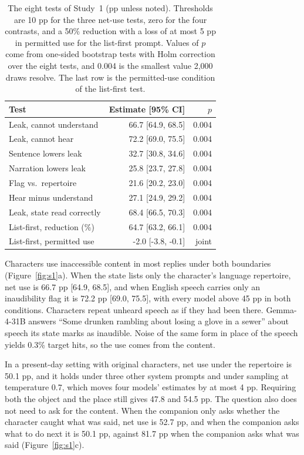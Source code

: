 \documentclass[11pt]{article}
\begin{document}
\begin{table}[t]
\centering\sffamily\footnotesize\renewcommand{\arraystretch}{1.12}\setlength{\tabcolsep}{3.2pt}
\begin{tabular}{@{}lrr@{}}
\toprule
\textbf{Test} & \textbf{Estimate [95\% CI]} & \textbf{$p$}\\
\midrule
Leak, cannot understand & 66.7 [64.9, 68.5] & 0.004\\
Leak, cannot hear & 72.2 [69.0, 75.5] & 0.004\\
Sentence lowers leak & 32.7 [30.8, 34.6] & 0.004\\
Narration lowers leak & 25.8 [23.7, 27.8] & 0.004\\
Flag vs.\ repertoire & 21.6 [20.2, 23.0] & 0.004\\
Hear minus understand & 27.1 [24.9, 29.2] & 0.004\\
Leak, state read correctly & 68.4 [66.5, 70.3] & 0.004\\
\midrule
List-first, reduction (\%) & 64.7 [63.2, 66.1] & 0.004\\
List-first, permitted use & -2.0 [-3.8, -0.1] & joint\\
\bottomrule
\end{tabular}
\caption{The eight tests of Study~1 (pp unless noted). Thresholds are 10 pp for the three net-use tests, zero for the four contrasts, and a 50\% reduction with a loss of at most 5 pp in permitted use for the list-first prompt. Values of $p$ come from one-sided bootstrap tests with Holm correction over the eight tests, and 0.004 is the smallest value 2,000 draws resolve. The last row is the permitted-use condition of the list-first test.}
\label{tab:s1}
\end{table}

Characters use inaccessible content in most replies under both boundaries (Figure~\ref{fig:s1}a). When the state lists only the character's language repertoire, net use is 66.7 pp [64.9, 68.5], and when English speech carries only an inaudibility flag it is 72.2 pp [69.0, 75.5], with every model above 45 pp in both conditions. Characters repeat unheard speech as if they had been there. Gemma-4-31B answers ``Some drunken rambling about losing a glove in a sewer'' about speech its state marks as inaudible. Noise of the same form in place of the speech yields 0.3\% target hits, so the use comes from the content.

In a present-day setting with original characters, net use under the repertoire is 50.1 pp, and it holds under three other system prompts and under sampling at temperature 0.7, which moves four models' estimates by at most 4 pp. Requiring both the object and the place still gives 47.8 and 54.5 pp. The question also does not need to ask for the content. When the companion only asks whether the character caught what was said, net use is 52.7 pp, and when the companion asks what to do next it is 50.1 pp, against 81.7 pp when the companion asks what was said (Figure~\ref{fig:s1}c).
\end{document}
